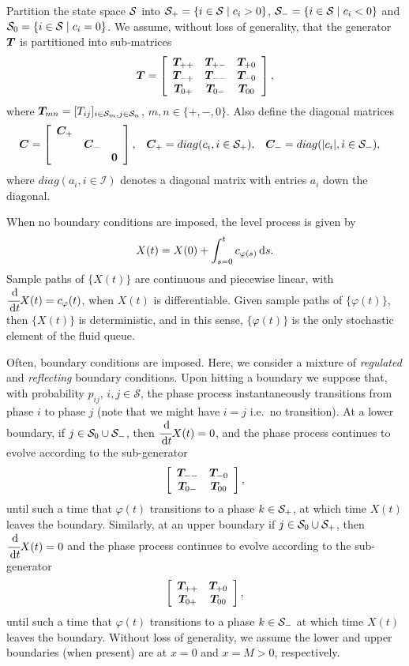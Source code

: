 Partition the state space \(\mathcal{S}\) into \(\mathcal{S}_+ = \{i\in\mathcal{S}\mid c_i>0\}\), \(\mathcal{S}_- = \{i\in\mathcal{S}\mid c_i<0\}\) and \(\mathcal{S}_0 = \{i\in\mathcal{S}\mid c_i=0\}\). We assume, without loss of generality, that the generator \(\boldsymbol T\) is partitioned into sub-matrices 
\[\boldsymbol T = \left[\begin{array}{ccc}\boldsymbol T_{++} & \boldsymbol T_{+-} & \boldsymbol T_{+0} \\ \boldsymbol T_{-+} & \boldsymbol T_{--} & \boldsymbol T_{-0} \\ \boldsymbol T_{0+} & \boldsymbol T_{0-} & \boldsymbol T_{00}  \end{array}\right],\]
where \(\boldsymbol T_{mn} = [T_{ij}]_{i\in\mathcal S_m, j\in\mathcal S_n}\), \(m,n\in\{+,-,0\}\). Also define the diagonal matrices 
\begin{align*}
	\boldsymbol C &= \left[\begin{array}{ccc} \boldsymbol C_+ && \\ &\boldsymbol C_-& \\ && \boldsymbol 0\end{array}\right], && \boldsymbol C_+ = diag(c_i,i\in\mathcal{S}_+), && \boldsymbol C_- = diag(|c_i|,i\in\mathcal{S}_-),
\end{align*}
where \(diag(a_i,i\in\mathcal I)\) denotes a diagonal matrix with entries \(a_i\) down the diagonal. 

When no boundary conditions are imposed, the level process is given by 
\[X(t) = X(0) + \int_{s=0}^t c_{\varphi(s)}\, \mathrm{d} s.\]
Sample paths of \(\{X(t)\}\) are continuous and piecewise linear, with \(\cfrac{\, \mathrm{d} }{\, \mathrm{d} t} X(t) = c_\varphi(t)\), when \(X(t)\) is differentiable. Given sample paths of \(\{\varphi(t)\}\), then \(\{X(t)\}\) is deterministic, and in this sense, \(\{\varphi(t)\}\) is the only stochastic element of the fluid queue. 

Often, boundary conditions are imposed. Here, we consider a mixture of \emph{regulated} and \emph{reflecting} boundary conditions. Upon hitting a boundary we suppose that, with probability \(p_{ij},\,i,j\in\mathcal S\), the phase process instantaneously transitions from phase \(i\) to phase \(j\) (note that we might have \(i=j\) i.e.~no transition). At a lower boundary, if \(j\in\mathcal{S}_0\cup\mathcal{S}_-\), then \(\cfrac{\, \mathrm{d}}{\, \mathrm{d} t} X(t) = 0\), and the phase process continues to evolve according to the sub-generator 
\[\left[\begin{array}{cc} \boldsymbol T_{--} & \boldsymbol T_{-0} \\ \boldsymbol T_{0-} & \boldsymbol T_{00}  \end{array}\right],\]
until such a time that \(\varphi(t)\) transitions to a phase \(k\in\mathcal{S}_+\), at which time \(X(t)\) leaves the boundary. Similarly, at an upper boundary if \(j\in\mathcal{S}_0\cup\mathcal{S}_+\), then \(\cfrac{\, \mathrm{d}}{\, \mathrm{d} t} X(t) = 0\) and the phase process continues to evolve according to the sub-generator 
\[\left[\begin{array}{cc} \boldsymbol T_{++} & \boldsymbol T_{+0} \\ \boldsymbol T_{0+} & \boldsymbol T_{00}  \end{array}\right],\]
until such a time that \(\varphi(t)\) transitions to a phase \(k\in\mathcal{S}_-\) at which time \(X(t)\) leaves the boundary. Without loss of generality, we assume the lower and upper boundaries (when present) are at \(x=0\) and \(x=M>0\), respectively.

